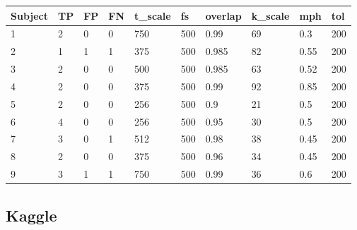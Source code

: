 \begin{table*}[!ht]
    \centering
	\begin{adjustbox}{width=\textwidth}
    \begin{tabular}{l|lllllllll}
    \toprule[0.5mm]
        Subject & TP & FP & FN & t\_scale & fs & overlap & k\_scale & mph & tol\\
        \midrule[0.3mm]
        1&2 & 0 & 0 & 750 & 500 & 0.99 & 69 & 0.3 & 200 \\ 
        2&1 & 1 & 1 & 375 & 500 & 0.985 & 82 & 0.55 & 200 \\ 
        3&2 & 0 & 0 & 500 & 500 & 0.985 & 63 & 0.52 & 200 \\ 
        4&2 & 0 & 0 & 375 & 500 & 0.99 & 92 & 0.85 & 200 \\ 
        5&2 & 0 & 0 & 256 & 500 & 0.9 & 21 & 0.5 & 200 \\ 
        6&4 & 0 & 0 & 256 & 500 & 0.95 & 30 & 0.5 & 200 \\ 
        7&3 & 0 & 1 & 512 & 500 & 0.98 & 38 & 0.45 & 200 \\ 
        8&2 & 0 & 0 & 375 & 500 & 0.96 & 34 & 0.45 & 200 \\ 
        9&3 & 1 & 1 & 750 & 500 & 0.99 & 36 & 0.6 & 200 \\
    \bottomrule[0.5mm]
    \end{tabular}
    \end{adjustbox}
\end{table*}

\subsection{Kaggle}

